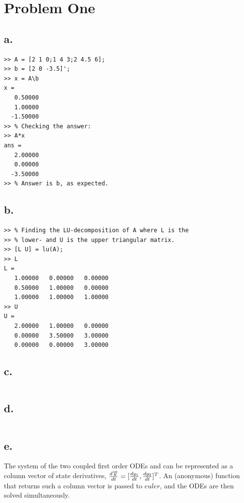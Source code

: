 \documentclass[00-main.tex]{subfiles}
\begin{document}
\section*{Problem One}

\subsection*{a.}

\begin{verbatim}
>> A = [2 1 0;1 4 3;2 4.5 6];
>> b = [2 0 -3.5]';
>> x = A\b
x =
   0.50000
   1.00000
  -1.50000
>> % Checking the answer:
>> A*x
ans =
   2.00000
   0.00000
  -3.50000
>> % Answer is b, as expected.
\end{verbatim}

\subsection*{b.}

\begin{verbatim}
>> % Finding the LU-decomposition of A where L is the
>> % lower- and U is the upper triangular matrix.
>> [L U] = lu(A);
>> L
L =
   1.00000   0.00000   0.00000
   0.50000   1.00000   0.00000
   1.00000   1.00000   1.00000
>> U
U =
   2.00000   1.00000   0.00000
   0.00000   3.50000   3.00000
   0.00000   0.00000   3.00000
\end{verbatim}

\subsection*{c.}

\inputminted[linenos]{matlab}{newton_c.m}

\subsection*{d.}

\inputminted[linenos]{matlab}{newton_d.m}

\subsection*{e.}
The system of the two coupled first order ODEs and can be represented as a column vector of state derivatives, $ {d \overrightarrow{y} \over dt} = [{dy_1 \over dt}, {dy_2 \over dt}]^T $. 
An (anonymous) function that returns such a column vector is passed to $euler$, and the ODEs are then solved simultaneously.
\end{document}
